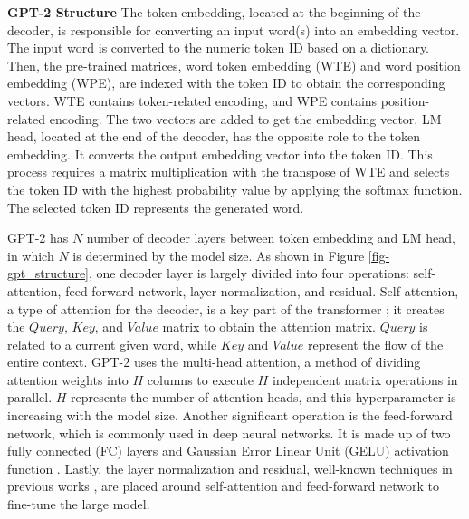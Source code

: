 \textbf{GPT-2 Structure}
The token embedding, located at the beginning of the decoder, is responsible for converting an input word(s) into an embedding vector. The input word is converted to the numeric token ID based on a dictionary. Then, the pre-trained matrices, word token embedding (WTE) and word position embedding (WPE), are indexed with the token ID to obtain the corresponding vectors. WTE contains token-related encoding, and WPE contains position-related encoding. The two vectors are added to get the embedding vector. LM head, located at the end of the decoder, has the opposite role to the token embedding. It converts the output embedding vector into the token ID. This process requires a matrix multiplication with the transpose of WTE and selects the token ID with the highest probability value by applying the softmax function. The selected token ID represents the generated word.

GPT-2 has $N$ number of decoder layers between token embedding and LM head, in which $N$ is determined by the model size. As shown in Figure \ref{fig-gpt_structure}, one decoder layer is largely divided into four operations: self-attention, feed-forward network, layer normalization, and residual. Self-attention, a type of attention for the decoder, is a key part of the transformer \cite{vaswani2017attention}; it creates the $Query$, $Key$, and $Value$ matrix to obtain the attention matrix. $Query$ is related to a current given word, while $Key$ and $Value$ represent the flow of the entire context. GPT-2 uses the multi-head attention\cite{radford2019language}, a method of dividing attention weights into $H$ columns to execute $H$ independent matrix operations in parallel. $H$ represents the number of attention heads, and this hyperparameter is increasing with the model size. Another significant operation is the feed-forward network, which is commonly used in deep neural networks. It is made up of two fully connected (FC) layers and Gaussian Error Linear Unit (GELU) activation function \cite{hendrycks2016gaussian}. Lastly, the layer normalization and residual, well-known techniques in previous works \cite{ba2016layer, he2016deep}, are placed around self-attention and feed-forward network to fine-tune the large model. 



